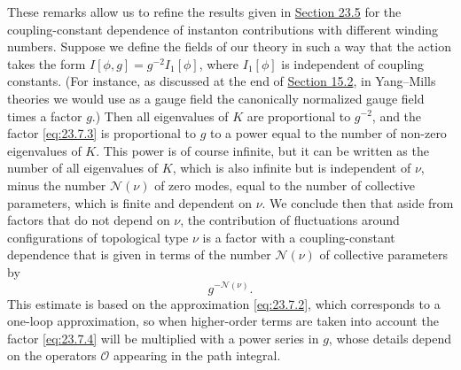 These remarks allow us to refine the results given in
\hyperref[sec:23.5]{Section 23.5} for the coupling-constant dependence of
instanton contributions with different winding numbers. Suppose we
define the fields of our theory in such a way that the action takes the
form $I[\phi,g]=g^{-2}I_1[\phi]$, where $I_1[\phi]$ is independent of
coupling constants. (For instance, as discussed at the end of
\hyperref[sec:15.2]{Section 15.2}, in Yang--Mills theories we would use
as a gauge field the canonically normalized gauge field times a factor
$g$.) Then all eigenvalues of $K$ are proportional to $g^{-2}$, and the
factor \eqref{eq:23.7.3} is proportional to $g$ to a power equal to the
number of non-zero eigenvalues of $K$. This power is of course infinite,
but it can be written as the number of all eigenvalues of $K$, which is
also infinite but is independent of $\nu$, minus the number
$\mathcal N(\nu)$ of zero modes, equal to the number of collective
parameters, which is finite and dependent on $\nu$. We conclude then
that aside from factors that do not depend on $\nu$, the contribution of
fluctuations around configurations of topological type $\nu$ is a factor
with a coupling-constant dependence that is given in terms of the number
$\mathcal N(\nu)$ of collective parameters by
\begin{equation}
g^{-\mathcal N(\nu)}.
\tag{23.7.4}\label{eq:23.7.4}
\end{equation}
This estimate is based on the approximation \eqref{eq:23.7.2}, which
corresponds to a one-loop approximation, so when higher-order terms are
taken into account the factor \eqref{eq:23.7.4} will be multiplied with
a power series in $g$, whose details depend on the operators $\mathcal O$
appearing in the path integral.

